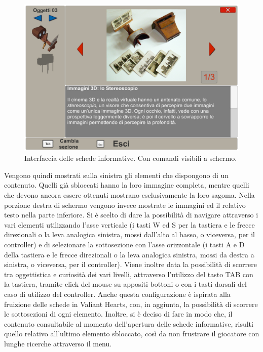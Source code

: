 \begin{figure}%
	\centering
	\includegraphics[width= 0.9\columnwidth]{images/gameDesign/58_interfaccia.jpg}
	\caption{Interfaccia delle schede informative. Con comandi visibili a schermo.}
	\label{fig:interfaccia_schede}
\end{figure}

Vengono quindi mostrati sulla sinistra gli elementi che dispongono di un contenuto. Quelli già sbloccati hanno la loro immagine completa, mentre quelli che devono ancora essere ottenuti mostrano esclusivamente la loro sagoma. Nella porzione destra di schermo vengono invece mostrate le immagini ed il relativo testo nella parte inferiore. Si è scelto di dare la possibilità di navigare attraverso i vari elementi utilizzando l’asse verticale (i tasti W ed S per la tastiera e le frecce direzionali o la leva analogica sinistra, mossi dall’alto al basso, o viceversa, per il controller) e di selezionare la sottosezione con l’asse orizzontale (i tasti A e D della tastiera e le frecce direzionali o la leva analogica sinistra, mossi da destra a sinistra, o viceversa, per il controller). Viene inoltre data la possibilità di scorrere tra oggettistica e curiosità dei vari livelli, attraverso l’utilizzo del tasto TAB con la tastiera, tramite click del mouse su appositi bottoni o con i tasti dorsali del caso di utilizzo del controller. Anche questa configurazione è ispirata alla fruizione delle schede in Valiant Hearts, con, in aggiunta, la possibilità di scorrere le sottosezioni di ogni elemento.
Inoltre, si è deciso di fare in modo che, il contenuto consultabile al momento dell’apertura delle schede informative, risulti quello relativo all’ultimo elemento sbloccato, così da non frustrare il giocatore con lunghe ricerche attraverso il menu.



